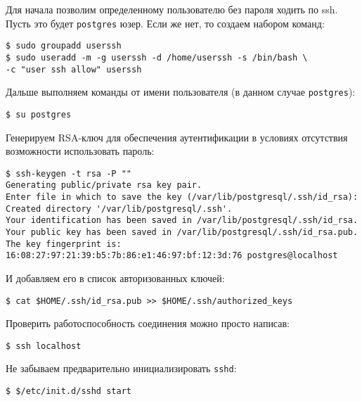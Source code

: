 Для начала позволим определенному пользователю без пароля ходить по ssh. Пусть это будет \lstinline!postgres! юзер. Если же нет, то создаем набором команд:

\begin{lstlisting}[label=lst:streaming1,caption=Создаем пользователя userssh]
$ sudo groupadd userssh
$ sudo useradd -m -g userssh -d /home/userssh -s /bin/bash \
-c "user ssh allow" userssh
\end{lstlisting}

Дальше выполняем команды от имени пользователя (в данном случае \lstinline!postgres!):

\begin{lstlisting}[label=lst:streaming2,caption=Логинимся под пользователем postgres]
$ su postgres
\end{lstlisting}

Генерируем RSA-ключ для обеспечения аутентификации в условиях отсутствия возможности использовать пароль:

\begin{lstlisting}[label=lst:streaming3,caption=Генерируем RSA-ключ]
$ ssh-keygen -t rsa -P ""
Generating public/private rsa key pair.
Enter file in which to save the key (/var/lib/postgresql/.ssh/id_rsa):
Created directory '/var/lib/postgresql/.ssh'.
Your identification has been saved in /var/lib/postgresql/.ssh/id_rsa.
Your public key has been saved in /var/lib/postgresql/.ssh/id_rsa.pub.
The key fingerprint is:
16:08:27:97:21:39:b5:7b:86:e1:46:97:bf:12:3d:76 postgres@localhost
\end{lstlisting}

И добавляем его в список авторизованных ключей:

\begin{lstlisting}[label=lst:streaming4,caption=Добавляем его в список авторизованных ключей]
$ cat $HOME/.ssh/id_rsa.pub >> $HOME/.ssh/authorized_keys
\end{lstlisting}

Проверить работоспособность соединения можно просто написав:

\begin{lstlisting}[label=lst:streaming5,caption=Пробуем зайти на ssh без пароля]
$ ssh localhost
\end{lstlisting}

Не забываем предварительно инициализировать \lstinline!sshd!:

\begin{lstlisting}[label=lst:streaming6,caption=Запуск sshd]
$ $/etc/init.d/sshd start
\end{lstlisting}

